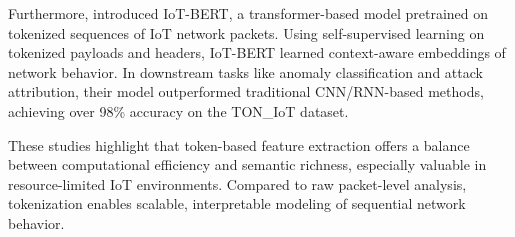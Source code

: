 \begin{ZhChapter}
    Furthermore, \cite{torres2022iotbert} introduced IoT-BERT, a transformer-based model pretrained on tokenized sequences of IoT network packets. Using self-supervised learning on tokenized payloads and headers, IoT-BERT learned context-aware embeddings of network behavior. In downstream tasks like anomaly classification and attack attribution, their model outperformed traditional CNN/RNN-based methods, achieving over 98\% accuracy on the TON\_IoT dataset.

    These studies highlight that token-based feature extraction offers a balance between computational efficiency and semantic richness, especially valuable in resource-limited IoT environments. Compared to raw packet-level analysis, tokenization enables scalable, interpretable modeling of sequential network behavior.




    \begin{table*}[htbp]
        \centering
        \caption{Examples of Field-Value Tokenization in IoT Network Traffic}
        \label{tab:tokenization_examples}
    \end{table*}



\end{ZhChapter}
